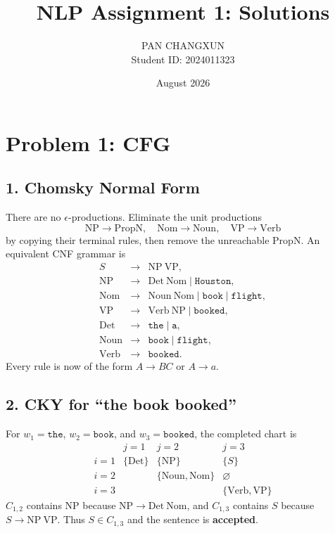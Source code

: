 \documentclass[11pt]{article}
\title{NLP Assignment 1: Solutions}
\author{PAN CHANGXUN\\Student ID: 2024011323}
\date{August 2026}
\begin{document}
\maketitle
\vspace{-2em}

\section*{Problem 1: CFG}
\subsection*{1. Chomsky Normal Form}

There are no $\epsilon$-productions.  Eliminate the unit productions
\[
\mathrm{NP}\to\mathrm{PropN},\quad
\mathrm{Nom}\to\mathrm{Noun},\quad
\mathrm{VP}\to\mathrm{Verb}
\]
by copying their terminal rules, then remove the unreachable $\mathrm{PropN}$.
An equivalent CNF grammar is
\[
\begin{array}{rcl}
S&\to&\mathrm{NP}\ \mathrm{VP},\\
\mathrm{NP}&\to&\mathrm{Det}\ \mathrm{Nom}\mid\texttt{Houston},\\
\mathrm{Nom}&\to&\mathrm{Noun}\ \mathrm{Nom}\mid\texttt{book}\mid\texttt{flight},\\
\mathrm{VP}&\to&\mathrm{Verb}\ \mathrm{NP}\mid\texttt{booked},\\
\mathrm{Det}&\to&\texttt{the}\mid\texttt{a},\\
\mathrm{Noun}&\to&\texttt{book}\mid\texttt{flight},\\
\mathrm{Verb}&\to&\texttt{booked}.
\end{array}
\]
Every rule is now of the form $A\to BC$ or $A\to a$.

\subsection*{2. CKY for ``the book booked''}

For $w_1=\texttt{the}$, $w_2=\texttt{book}$, and
$w_3=\texttt{booked}$, the completed chart is
\[
\begin{array}{c|ccc}
&j=1&j=2&j=3\\ \hline
i=1&\{\mathrm{Det}\}&\{\mathrm{NP}\}&\{S\}\\
i=2&&\{\mathrm{Noun},\mathrm{Nom}\}&\varnothing\\
i=3&&&\{\mathrm{Verb},\mathrm{VP}\}
\end{array}
\]
$C_{1,2}$ contains $\mathrm{NP}$ because
$\mathrm{NP}\to\mathrm{Det}\ \mathrm{Nom}$, and $C_{1,3}$ contains $S$
because $S\to\mathrm{NP}\ \mathrm{VP}$.  Thus $S\in C_{1,3}$ and the
sentence is \textbf{accepted}.
\end{document}
